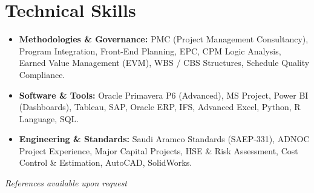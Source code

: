 \documentclass[11pt,a4paper]{article}
\begin{document}
\section{Technical Skills}
\begin{itemize}[label={\color{awesome-blue}\small\textbullet}, leftmargin=*, itemsep=0pt, parsep=0pt]
    \raggedright
    \item \textbf{Methodologies \& Governance:} PMC (Project Management Consultancy), Program Integration, Front-End Planning, EPC, CPM Logic Analysis, Earned Value Management (EVM), WBS / CBS Structures, Schedule Quality Compliance.
    \item \textbf{Software \& Tools:} Oracle Primavera P6 (Advanced), MS Project, Power BI (Dashboards), Tableau, SAP, Oracle ERP, IFS, Advanced Excel, Python, R Language, SQL.
    \item \textbf{Engineering \& Standards:} Saudi Aramco Standards (SAEP-331), ADNOC Project Experience, Major Capital Projects, HSE \& Risk Assessment, Cost Control \& Estimation, AutoCAD, SolidWorks.
\end{itemize}

\vfill
\begin{center}
    \textit{References available upon request}
\end{center}
\end{document}
